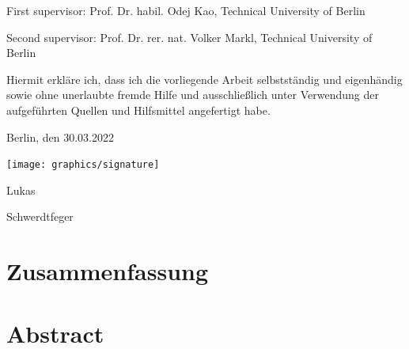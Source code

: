 \rule{0cm}{20cm}

\noindent First supervisor: 
\noindent Prof. Dr. habil. Odej Kao, Technical University of Berlin

\noindent Second supervisor: 
\noindent Prof. Dr. rer. nat. Volker Markl, Technical University of Berlin

\thispagestyle{empty}

\rule{0cm}{10cm}

\noindent Hiermit erkl\"are ich, dass ich die vorliegende Arbeit selbstst\"andig und eigenh\"andig sowie ohne
unerlaubte fremde Hilfe und ausschließlich unter Verwendung der aufgef\"uhrten Quellen und
Hilfsmittel angefertigt habe.

Berlin, den 30.03.2022

\vspace{1cm}
\texttt{[image: graphics/signature]} \par
Lukas \par
Schwerdtfeger
\vspace{1cm}


\thispagestyle{empty}




\chapter*{Zusammenfassung}

\abstracttextde

\thispagestyle{empty}
\newpage
\vspace*{3cm}
\thispagestyle{empty}

\chapter*{Abstract}

\abstracttext

\thispagestyle{empty}
\newpage
\vspace*{3cm}
\thispagestyle{empty}



\setcounter{page}{8}
\tableofcontents

\newpage


\listoffigures
\listoflistings
\newpage
\thispagestyle{empty}
\newpage
\vspace*{3cm}
\thispagestyle{empty} \newpage
{}\setcounter{page}{1}